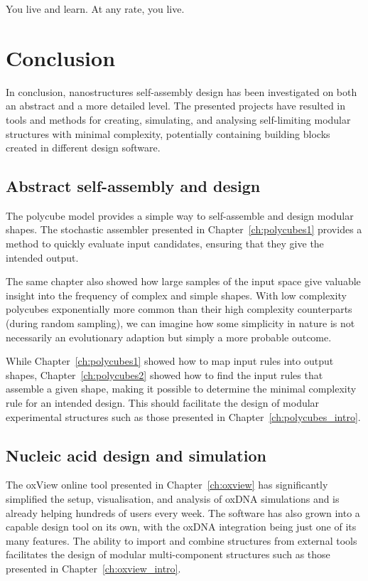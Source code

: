 \begin{savequote}[8cm]
You live and learn. At any rate, you live.
\end{savequote}

\chapter{Conclusion}
\label{ch:conclusion}

In conclusion, nanostructures self-assembly design has been investigated on both an abstract and a more detailed level. The presented projects have resulted in tools and methods for creating, simulating, and analysing self-limiting modular structures with minimal complexity, potentially containing building blocks created in different design software.


\section{Abstract self-assembly and design}

The polycube model provides a simple way to self-assemble and design modular shapes. The stochastic assembler presented in Chapter~\ref{ch:polycubes1} provides a method to quickly evaluate input candidates, ensuring that they give the intended output.

The same chapter also showed how large samples of the input space give valuable insight into the frequency of complex and simple shapes. With low complexity polycubes exponentially more common than their high complexity counterparts (during random sampling), we can imagine how some simplicity in nature is not necessarily an evolutionary adaption but simply a more probable outcome.

While Chapter~\ref{ch:polycubes1} showed how to map input rules into output shapes, Chapter~\ref{ch:polycubes2} showed how to find the input rules that assemble a given shape, making it possible to determine the minimal complexity rule for an intended design. This should facilitate the design of modular experimental structures such as those presented in Chapter~\ref{ch:polycubes_intro}.

\section{Nucleic acid design and simulation}

The oxView online tool presented in Chapter~\ref{ch:oxview} has significantly simplified the setup, visualisation, and analysis of oxDNA simulations and is already helping hundreds of users every week. The software has also grown into a capable design tool on its own, with the oxDNA integration being just one of its many features. The ability to import and combine structures from external tools facilitates the design of modular multi-component structures such as those presented in Chapter~\ref{ch:oxview_intro}.

